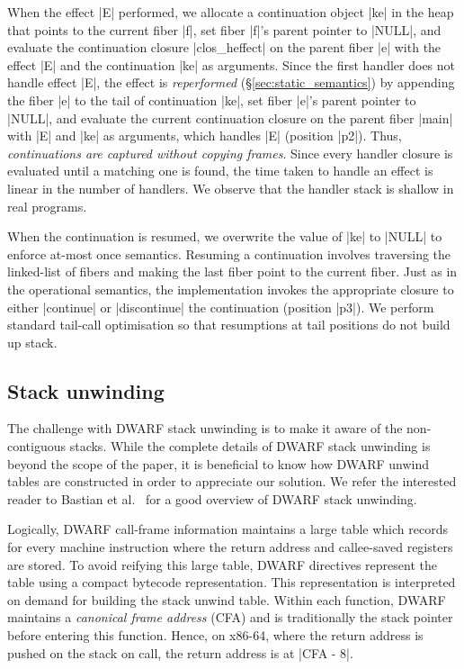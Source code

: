 \documentclass[sigplan,10pt,review,anonymous]{acmart}\settopmatter{printfolios=true,printccs=false,printacmref=false}
\begin{document}
When the effect |E| performed, we allocate a continuation object |ke| in the
heap that points to the current fiber |f|, set fiber |f|'s parent pointer to
|NULL|, and evaluate the continuation closure |clos_heffect| on the parent
fiber |e| with the effect |E| and the continuation |ke| as arguments. Since the
first handler does not handle effect |E|, the effect is \emph{reperformed}
(\S\ref{sec:static_semantics}) by appending the fiber |e| to the tail of
continuation |ke|, set fiber |e|'s parent pointer to |NULL|, and evaluate the
current continuation closure on the parent fiber |main| with |E| and |ke| as
arguments, which handles |E| (position |p2|). Thus, \emph{continuations are
captured without copying frames}. Since every handler closure is evaluated
until a matching one is found, the time taken to handle an effect is linear in
the number of handlers. We observe that the handler stack is shallow in real
programs.

When the continuation is resumed, we overwrite the value of |ke| to |NULL| to
enforce at-most once semantics. Resuming a continuation involves traversing the
linked-list of fibers and making the last fiber point to the current fiber.
Just as in the operational semantics, the implementation invokes the
appropriate closure to either |continue| or |discontinue| the continuation
(position |p3|). We perform standard tail-call optimisation so that resumptions
at tail positions do not build up stack.

\subsection{Stack unwinding}

The challenge with DWARF stack unwinding is to make it aware of the
non-contiguous stacks. While the complete details of DWARF stack unwinding is
beyond the scope of the paper, it is beneficial to know how DWARF unwind tables
are constructed in order to appreciate our solution. We refer the interested
reader to Bastian et al.~\cite{Bastian19} for a good overview of DWARF stack
unwinding.

Logically, DWARF call-frame information maintains a large table which records
for every machine instruction where the return address and callee-saved
registers are stored. To avoid reifying this large table, DWARF directives
represent the table using a compact bytecode representation. This representation
is interpreted on demand for building the stack unwind table. Within each
function, DWARF maintains a \emph{canonical frame address} (CFA) and is
traditionally the stack pointer before entering this function. Hence, on x86-64,
where the return address is pushed on the stack on call, the return address is
at |CFA - 8|.
\end{document}
